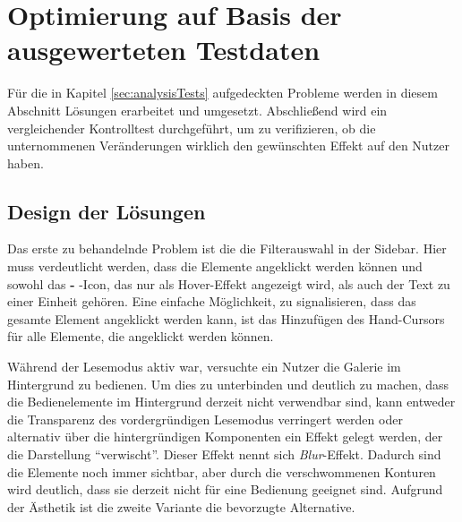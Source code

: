 \chapter{Optimierung auf Basis der ausgewerteten Testdaten}
Für die in Kapitel \ref{sec:analysisTests} aufgedeckten Probleme werden in diesem Abschnitt Lösungen erarbeitet und umgesetzt. Abschließend wird ein vergleichender Kontrolltest durchgeführt, um zu verifizieren, ob die unternommenen Veränderungen wirklich den gewünschten Effekt auf den Nutzer haben.\par
\section{Design der Lösungen} \label{sec:optiDesign}
Das erste zu behandelnde Problem ist die die Filterauswahl in der Sidebar. Hier muss verdeutlicht werden, dass die Elemente angeklickt werden können und sowohl das \textbf{-} -Icon, das nur als Hover-Effekt angezeigt wird, als auch der Text zu einer Einheit gehören. %
Eine einfache Möglichkeit, zu signalisieren, dass das gesamte Element angeklickt werden kann, ist das Hinzufügen des Hand-Cursors für alle Elemente, die angeklickt werden können.\par
Während der Lesemodus aktiv war, versuchte ein Nutzer die Galerie im Hintergrund zu bedienen. Um dies zu unterbinden und deutlich zu machen, dass die Bedienelemente im Hintergrund derzeit nicht verwendbar sind, kann entweder die Transparenz des vordergründigen Lesemodus verringert werden oder alternativ über die hintergründigen Komponenten ein Effekt gelegt werden, der die Darstellung \enquote{verwischt}. Dieser Effekt nennt sich \textit{Blur}-Effekt. Dadurch sind die Elemente noch immer sichtbar, aber durch die verschwommenen Konturen wird deutlich, dass sie derzeit nicht für eine Bedienung geeignet sind. Aufgrund der Ästhetik ist die zweite Variante die bevorzugte Alternative.\par
